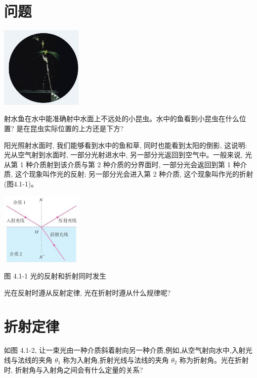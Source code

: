 \documentclass[10pt]{article}
\begin{document}
\section*{问题}

\begin{center}
\includegraphics[max width=0.3\textwidth]{images/01910e4c-ebb8-7d2c-8f2f-2375bc1d2d12_90_548438.jpg}
\end{center}

射水鱼在水中能准确射中水面上不远处的小昆虫。水中的鱼看到小昆虫在什么位置? 是在昆虫实际位置的上方还是下方?

阳光照射水面时, 我们能够看到水中的鱼和草, 同时也能看到太阳的倒影, 这说明: 光从空气射到水面时, 一部分光射进水中, 另一部分光返回到空气中。一般来说, 光从第 1 种介质射到该介质与第 2 种介质的分界面时, 一部分光会返回到第 1 种介质, 这个现象叫作光的反射; 另一部分光会进入第 2 种介质, 这个现象叫作光的折射 (图4.1-1)。

\begin{center}
\includegraphics[max width=0.3\textwidth]{images/01910e4c-ebb8-7d2c-8f2f-2375bc1d2d12_90_103386.jpg}
\end{center}

图 4.1-1 光的反射和折射同时发生

光在反射时遵从反射定律, 光在折射时遵从什么规律呢?

\section*{折射定律}

如图 4.1-2, 让一束光由一种介质斜着射向另一种介质,例如,从空气射向水中,入射光线与法线的夹角 \({\theta }_{1}\) 称为入射角,折射光线与法线的夹角 \({\theta }_{2}\) 称为折射角。光在折射时, 折射角与入射角之间会有什么定量的关系?
\end{document}
